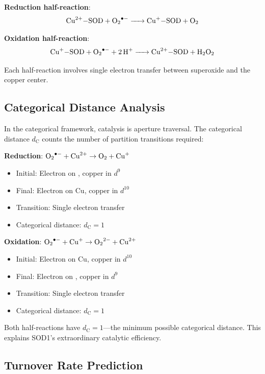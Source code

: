 \documentclass[twocolumn,aps,prx,superscriptaddress,longbibliography]{revtex4-2}
\theoremstyle{remark}
\newcommand{\dC}{d_\text{C}}
\begin{document}
\textbf{Reduction half-reaction}:
\begin{equation}
\ce{Cu^{2+}-SOD + O2^{.-} -> Cu^{+}-SOD + O2}
\label{eq:reduction}
\end{equation}

\textbf{Oxidation half-reaction}:
\begin{equation}
\ce{Cu^{+}-SOD + O2^{.-} + 2H^+ -> Cu^{2+}-SOD + H2O2}
\label{eq:oxidation}
\end{equation}

Each half-reaction involves single electron transfer between superoxide
and the copper center.

\subsection{Categorical Distance Analysis}

In the categorical framework, catalysis is aperture traversal. The
categorical distance $\dC$ counts the number of partition transitions
required:

\textbf{Reduction}: $\ce{O2^{.-}} + \ce{Cu^{2+}} \to \ce{O2} + \ce{Cu^{+}}$
\begin{itemize}
    \item Initial: Electron on , copper in $d^9$
    \item Final: Electron on Cu, copper in $d^{10}$
    \item Transition: Single electron transfer
    \item Categorical distance: $\dC = 1$
\end{itemize}

\textbf{Oxidation}: $\ce{O2^{.-}} + \ce{Cu^{+}} \to \ce{O2^{2-}} + \ce{Cu^{2+}}$
\begin{itemize}
    \item Initial: Electron on Cu, copper in $d^{10}$
    \item Final: Electron on , copper in $d^9$
    \item Transition: Single electron transfer
    \item Categorical distance: $\dC = 1$
\end{itemize}

Both half-reactions have $\dC = 1$---the minimum possible categorical
distance. This explains SOD1's extraordinary catalytic efficiency.

\subsection{Turnover Rate Prediction}
\end{document}

